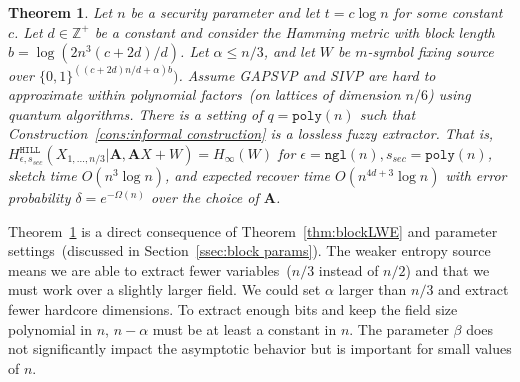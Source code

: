 \documentclass[11pt]{article}
\newcommand{\secref}[1]{\mbox{Section~\ref{#1}}}
\newcommand{\thref}[1]{\mbox{Theorem~\ref{#1}}}
\newcommand{\consref}[1]{\mbox{Construction~\ref{#1}}}
\newcommand{\zo}{\ensuremath{\{0, 1\}}}
\newcommand{\vect}[1]{\ensuremath{\textbf{#1}}}
\newcommand{\hill}{\ensuremath{\mathtt{HILL}}\xspace}
\newcommand{\poly}{\ensuremath{\mathtt{poly}}\xspace}
\newcommand{\ngl}{\ensuremath{\mathtt{ngl}}\xspace}
\newcommand{\Hoo}{\mathrm{H}_\infty}
\newtheorem{theorem}{Theorem}[section]
\newcommand{\vA}{\vect{A}}
\begin{document}
\begin{theorem}
\label{thm:lossless block sketch log}
Let $n$ be a security parameter and let $t = c\log n$ for some constant $c$.  Let $d\in\mathbb{Z}^+$ be a constant and consider the Hamming metric with block length $b = \log (2n^3 (c+2d)/d)$.  Let $\alpha \leq n/3$, and let $W$ be $m$-symbol fixing source over $\zo^{\left((c+2d)n/d+\alpha \right)b})$.  Assume GAPSVP and SIVP are hard to approximate within polynomial factors~(on lattices of dimension $n/6$) using quantum algorithms.   There is a setting of $q = \poly(n)$ such that \consref{cons:informal construction} is a lossless fuzzy extractor.  That is, $H^{\hill}_{\epsilon, s_{sec}}(X_{1,..., n/3} |\vA, \vA X+W) = H_\infty(W)$ for %
$\epsilon = \ngl(n), s_{sec} = \poly(n)$, sketch time $O(n^3\log n)$, and expected recover time $O(n^{4d+3} \log n)$ with error probability $\delta = e^{-\Omega(n)}$ over the choice of $\vA$.
\end{theorem}

\thref{thm:lossless block sketch log} is a direct consequence of \thref{thm:blockLWE} and parameter settings~(discussed in  \secref{ssec:block params}).  The weaker entropy source means we are able to extract fewer variables~($n/3$ instead of $n/2$) and that we must work over a slightly larger field.  We could set $\alpha$ larger than $n/3$ and extract fewer hardcore dimensions.  To extract enough bits and keep the field size polynomial in $n$, $n-\alpha$ must be at least a constant in $n$.  The parameter $\beta$ does not significantly impact the asymptotic behavior but is important for small values of $n$.
\end{document}
